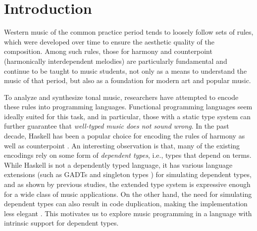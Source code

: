\documentclass[sigplan,10pt,screen]{acmart}
\begin{document}
\maketitle

\section{Introduction}

Western music of the common practice period tends to loosely
follow sets of rules, which were developed over time to ensure
the aesthetic quality of the composition. 
Among such rules, those for harmony \citep{piston1987harmony}
and counterpoint (harmonically interdependent melodies) 
\citep{fux1965study} are particularly fundamental and continue 
to be taught to music students, not only as a means to understand 
the music of that period, but also as a foundation for modern art 
and popular music.

To analyze and synthesize tonal music, researchers have
attempted to encode these rules into programming languages.
Functional programming languages seem
ideally suited for this task, and in particular, those with a static
type system can further guarantee that \emph{well-typed music 
does not sound wrong}.
In the past decade, Haskell has been a popular choice for encoding
the rules of harmony \citep{fmmh, hihseufha, faamh, hafha, fghm}
as well as counterpoint \citep{szamozvancev2017well}.
An interesting observation is that, many of the existing encodings
rely on some form of \emph{dependent types}, i.e.,  
types that depend on terms. 
While Haskell is not a dependently typed language, it has various 
language extensions (such as GADTs \citep{cheney2002lightweight} 
and singleton types \citep{eisenberg2013dependently}) for 
simulating dependent types, and as shown by previous studies,
the extended type system is expressive enough for 
a wide class of music applications.
On the other hand, the need for simulating dependent types 
can also result in code duplication, making the implementation 
less elegant \citep{monnier2010singleton}.
This motivates us to explore music programming in a language
with intrinsic support for dependent types.
\end{document}
